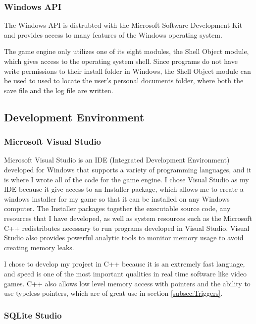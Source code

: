 \documentclass{article}
\begin{document}
\subsubsection{Windows API} \label{subsubsec:SHLOBJ}

The Windows API is distrubted with the Microsoft Software Development Kit and provides access to many features of the Windows operating system.

The game engine only utilizes one of its eight modules, the Shell Object module, which gives access to the operating system shell. Since programs do not have write permissions to their install folder in Windows, the Shell Object module can be used to used to locate the user's personal documents folder, where both the save file and the log file are written.

\subsection{Development Environment} \label{subsec:DevelopmentEnvironment}

\subsubsection{Microsoft Visual Studio} \label{subsubsec:MVS}

Microsoft Visual Studio is an IDE (Integrated Development Environment) developed for Windows that supports a variety of programming languages, and it is where I wrote all of the code for the game engine. I chose Visual Studio as my IDE because it give access to an Installer package, which allows me to create a windows installer for my game so that it can be installed on any Windows computer. The Installer packages together the executable source code, any resources that I have developed, as well as system resources such as the Microsoft C++ redistributes necessary to run programs developed in Visual Studio. Visual Studio also provides powerful analytic tools to monitor memory usage to avoid creating memory leaks.

I chose to develop my project in C++ because it is an extremely fast language, and speed is one of the most important qualities in real time software like video games. C++ also allows low level memory access with pointers and the ability to use typeless pointers, which are of great use in section \ref{subsec:Triggers}.

\subsubsection{SQLite Studio} \label{subsubsec:SQLStudio}
\end{document}
